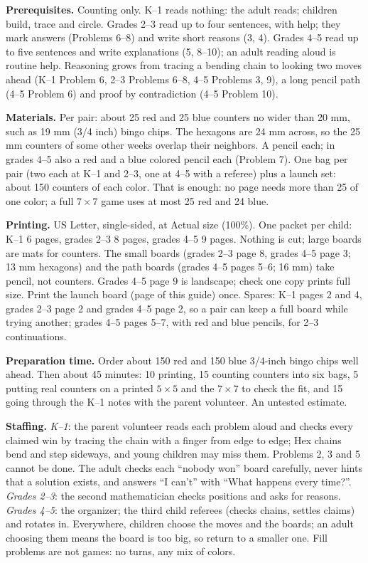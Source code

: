 \documentclass[11pt]{article}
\newcommand{\x}{\ensuremath{\times}}
\begin{document}
\textbf{Prerequisites.} Counting only. K--1 reads nothing: the adult reads; children build, trace and circle. Grades 2--3 read up to four sentences, with help; they mark answers (Problems 6--8) and write short reasons (3, 4). Grades 4--5 read up to five sentences and write explanations (5, 8--10); an adult reading aloud is routine help. Reasoning grows from tracing a bending chain to looking two moves ahead (K--1 Problem 6, 2--3 Problems 6--8, 4--5 Problems 3, 9), a long pencil path (4--5 Problem 6) and proof by contradiction (4--5 Problem 10).

\textbf{Materials.} Per pair: about 25 red and 25 blue counters no wider than 20 mm, such as 19 mm (3/4 inch) bingo chips. The hexagons are 24 mm across, so the 25 mm counters of some other weeks overlap their neighbors. A pencil each; in grades 4--5 also a red and a blue colored pencil each (Problem 7). One bag per pair (two each at K--1 and 2--3, one at 4--5 with a referee) plus a launch set: about 150 counters of each color. That is enough: no page needs more than 25 of one color; a full $7\x7$ game uses at most 25 red and 24 blue.

\textbf{Printing.} US Letter, single-sided, at Actual size (100\%). One packet per child: K--1 6 pages, grades 2--3 8 pages, grades 4--5 9 pages. Nothing is cut; large boards are mats for counters. The small boards (grades 2--3 page 8, grades 4--5 page 3; 13 mm hexagons) and the path boards (grades 4--5 pages 5--6; 16 mm) take pencil, not counters. Grades 4--5 page 9 is landscape; check one copy prints full size. Print the launch board (page \pageref{launchboard} of this guide) once. Spares: K--1 pages 2 and 4, grades 2--3 page 2 and grades 4--5 page 2, so a pair can keep a full board while trying another; grades 4--5 pages 5--7, with red and blue pencils, for 2--3 continuations.

\textbf{Preparation time.} Order about 150 red and 150 blue 3/4-inch bingo chips well ahead. Then about 45 minutes: 10 printing, 15 counting counters into six bags, 5 putting real counters on a printed $5\x5$ and the $7\x7$ to check the fit, and 15 going through the K--1 notes with the parent volunteer. An untested estimate.

\textbf{Staffing.} \emph{K--1}: the parent volunteer reads each problem aloud and checks every claimed win by tracing the chain with a finger from edge to edge; Hex chains bend and step sideways, and young children may miss them. Problems 2, 3 and 5 cannot be done. The adult checks each ``nobody won'' board carefully, never hints that a solution exists, and answers ``I can't'' with ``What happens every time?''. \emph{Grades 2--3}: the second mathematician checks positions and asks for reasons. \emph{Grades 4--5}: the organizer; the third child referees (checks chains, settles claims) and rotates in. Everywhere, children choose the moves and the boards; an adult choosing them means the board is too big, so return to a smaller one. Fill problems are not games: no turns, any mix of colors.
\end{document}
